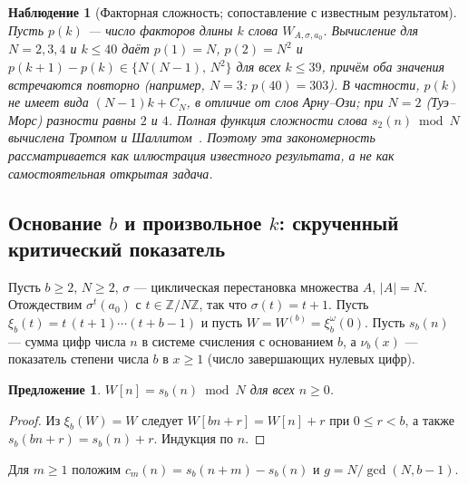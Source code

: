 \documentclass[a4paper,14pt]{extreport}
\theoremstyle{plain}
\newtheorem{proposition}[theorem]{Предложение}
\newtheorem{observation}[theorem]{Наблюдение}
\theoremstyle{definition}
\theoremstyle{remark}
\begin{document}
\begin{observation}[Факторная сложность; сопоставление с известным результатом]
	Пусть $p(k)$ --- число факторов длины $k$ слова $W_{A,\sigma,a_0}$. Вычисление для $N=2,3,4$ и $k\le40$ даёт $p(1)=N$, $p(2)=N^2$ и
	$p(k+1)-p(k)\in\{N(N-1),\,N^2\}$ для всех $k\le39$, причём оба значения встречаются повторно (например, $N=3$: $p(40)=303$).
	В частности, $p(k)$ не имеет вида $(N-1)k+C_N$, в отличие от слов Арну--Ози; при $N=2$ (Туэ--Морс) разности равны $2$ и $4$.
Полная функция сложности слова $s_2(n)\bmod N$ вычислена Тромпом и Шаллитом~\cite{TrompShallit1995}. Поэтому эта закономерность рассматривается как иллюстрация известного результата, а не как самостоятельная открытая задача.
\end{observation}
\subsection{\texorpdfstring{Основание $b$ и произвольное $k$: скрученный критический показатель}{Основание b и произвольное k: скрученный критический показатель}}\label{sec:twistedk}

Пусть $b\ge2$, $N\ge2$, $\sigma$ --- циклическая перестановка множества $A$, $|A|=N$. Отождествим
$\sigma^t(a_0)$ с $t\in\mathbb Z/N\mathbb Z$, так что $\sigma(t)=t+1$. Пусть
$\xi_b(t)=t\,(t+1)\cdots(t+b-1)$ и пусть $W=W^{(b)}=\xi_b^\omega(0)$. Пусть $s_b(n)$ --- сумма
цифр числа $n$ в системе счисления с основанием $b$, а $\nu_b(x)$ --- показатель степени числа $b$ в $x\ge1$ (число завершающих нулевых цифр).

\begin{proposition}\label{tw:gTM}
	$W[n]=s_b(n)\bmod N$ для всех $n\ge0$.
\end{proposition}
\begin{proof}
	Из $\xi_b(W)=W$ следует $W[bn+r]=W[n]+r$ при $0\le r<b$, а также $s_b(bn+r)=s_b(n)+r$.
	Индукция по $n$.
\end{proof}

Для $m\ge1$ положим $c_m(n)=s_b(n+m)-s_b(n)$ и $g=N/\gcd(N,b-1)$.
\end{document}

